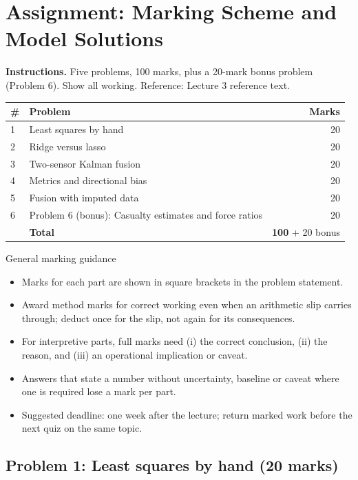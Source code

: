 \documentclass[11pt]{article}
\begin{document}
\section{Assignment: Marking Scheme and Model Solutions}

\textbf{Instructions.} Five problems, 100 marks, plus a 20-mark bonus problem (Problem 6). Show all working. Reference: Lecture 3 reference text.

\begin{center}\small\renewcommand{\arraystretch}{1.25}\begin{tabularx}{0.85\textwidth}{@{}l X r@{}}\toprule\textbf{\#} & \textbf{Problem} & \textbf{Marks}\\\midrule1 & Least squares by hand & 20\\
2 & Ridge versus lasso & 20\\
3 & Two-sensor Kalman fusion & 20\\
4 & Metrics and directional bias & 20\\
5 & Fusion with imputed data & 20\\
6 & Problem 6 (bonus): Casualty estimates and force ratios & 20\\\midrule & \textbf{Total} & \textbf{100} + 20 bonus\\\bottomrule\end{tabularx}\end{center}

\begin{instr}{General marking guidance}\begin{itemize}
\item Marks for each part are shown in square brackets in the problem statement.
\item Award method marks for correct working even when an arithmetic slip carries through; deduct once for the slip, not again for its consequences.
\item For interpretive parts, full marks need (i) the correct conclusion, (ii) the reason, and (iii) an operational implication or caveat.
\item Answers that state a number without uncertainty, baseline or caveat where one is required lose a mark per part.
\item Suggested deadline: one week after the lecture; return marked work before the next quiz on the same topic.
\end{itemize}\end{instr}

\subsection{Problem 1: Least squares by hand \normalfont\small\color{GreyN}(20 marks)}
\end{document}
